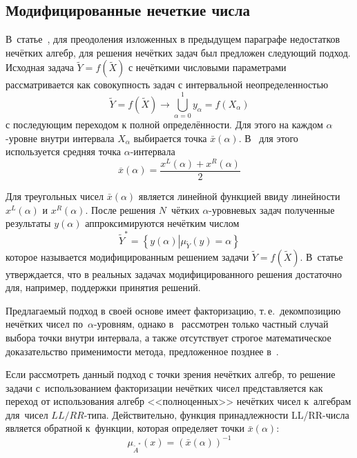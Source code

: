 \subsection{Модифицированные нечеткие числа}

В~статье~\cite{Lebedev}, для преодоления изложенных в предыдущем параграфе недостатков нечётких алгебр, для решения нечётких задач был предложен следующий подход. Исходная задача $\tilde{Y}=f\left( {\tilde{X}} \right)$ с нечёткими числовыми параметрами рассматривается как совокупность задач с интервальной неопределенностью
\begin{equation}
\label{eq:alpha-equivalence}
	\tilde{Y} = f\left( \tilde X \right)\to \bigcup\limits_{\alpha =0}^{1}{y_\alpha}=f\left( X_\alpha \right)
\end{equation}
с последующим переходом к полной определённости. Для этого на каждом $\alpha$-уровне внутри интервала $X_\alpha$ выбирается точка $\bar{x}\left( \alpha  \right)$. В~\cite{Lebedev} для этого используется средняя точка $\alpha$-интервала
\begin{equation}
  \label{eq:L-transform-midpoint}
  \overline{x}\left( \alpha  \right)=\frac{x^L\left( \alpha  \right)+x^R\left( \alpha  \right)}{2}
\end{equation}

Для треугольных чисел $\bar{x}\left( \alpha  \right)$ является линейной функцией ввиду линейности $x^L\left( \alpha  \right)$ и $x^R\left( \alpha  \right)$. После решения $N$~чётких $\alpha $-уровневых задач полученные результаты $y\left( \alpha  \right)$ аппроксимируются нечётким числом
\begin{equation*}
  \tilde Y^{*}=\left\{ y(\alpha )\left| \mu_{\tilde Y}(y)=\alpha \right. \right\}
\end{equation*}
которое называется модифицированным решением задачи $\tilde{Y}=f\left( \tilde X \right)$. В~статье утверждается, что в реальных задачах модифицированного решения достаточно для, например, поддержки принятия решений. 

Предлагаемый подход в своей основе имеет факторизацию, т.\,е.~декомпозицию нечётких чисел по~$\alpha$-уровням, однако в~\cite{Lebedev} рассмотрен только частный случай выбора точки внутри интервала, а также отсутствует строгое математическое доказательство применимости метода, предложенное позднее в~\cite{Vorontsov_PI}.

Если рассмотреть данный подход с точки зрения нечётких алгебр, то решение задачи с~использованием факторизации нечётких чисел представляется как переход от использования алгебр <<полноценных>> нечётких чисел к~алгебрам для~чисел $LL/RR$-типа. Действительно, функция принадлежности LL/RR-числа является обратной к~функции, которая определяет точки $\bar{x}\left(\alpha \right)$:
\begin{equation}
\label{eq:modified-inverse-function}
  \mu_{\tilde A^{*}}\left( x \right)={\left( \bar{x}\left( \alpha  \right) \right)}^{-1}
\end{equation}

